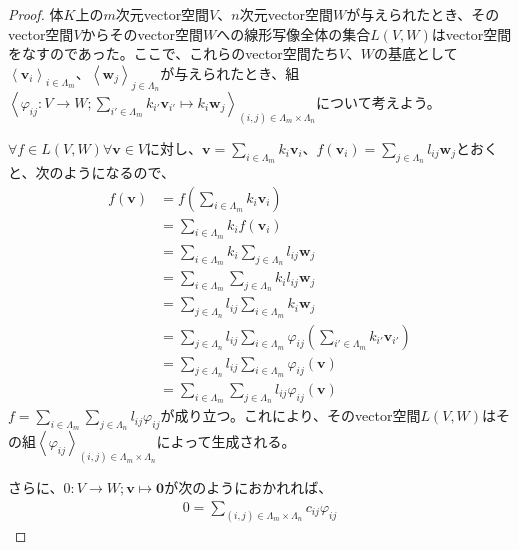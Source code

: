 \documentclass[dvipdfmx]{jsarticle}
\begin{document}
\begin{proof}
体$K$上の$m$次元vector空間$V$、$n$次元vector空間$W$が与えられたとき、そのvector空間$V$からそのvector空間$W$への線形写像全体の集合$L(V,W)$はvector空間をなすのであった。ここで、これらのvector空間たち$V$、$W$の基底として$\left\langle \mathbf{v}_{i} \right\rangle_{i \in \varLambda_{m}}$、$\left\langle \mathbf{w}_{j} \right\rangle_{j \in \varLambda_{n}}$が与えられたとき、組$\left\langle \varphi_{ij}:V \rightarrow W;\sum_{i' \in \varLambda_{m}} {k_{i'}\mathbf{v}_{i'}} \mapsto k_{i}\mathbf{w}_{j} \right\rangle_{(i,j) \in \varLambda_{m} \times \varLambda_{n}}$について考えよう。\par
$\forall f \in L(V,W)\forall\mathbf{v} \in V$に対し、$\mathbf{v} = \sum_{i \in \varLambda_{m}} {k_{i}\mathbf{v}_{i}}$、$f\left( \mathbf{v}_{i} \right) = \sum_{j \in \varLambda_{n}} {l_{ij}\mathbf{w}_{j}}$とおくと、次のようになるので、
\begin{align*}
f\left( \mathbf{v} \right) &= f\left( \sum_{i \in \varLambda_{m}} {k_{i}\mathbf{v}_{i}} \right)\\
&= \sum_{i \in \varLambda_{m}} {k_{i}f\left( \mathbf{v}_{i} \right)}\\
&= \sum_{i \in \varLambda_{m}} {k_{i}\sum_{j \in \varLambda_{n}} {l_{ij}\mathbf{w}_{j}}}\\
&= \sum_{i \in \varLambda_{m}} {\sum_{j \in \varLambda_{n}} {k_{i}l_{ij}\mathbf{w}_{j}}}\\
&= \sum_{j \in \varLambda_{n}} {l_{ij}\sum_{i \in \varLambda_{m}} {k_{i}\mathbf{w}_{j}}}\\
&= \sum_{j \in \varLambda_{n}} {l_{ij}\sum_{i \in \varLambda_{m}} {\varphi_{ij}\left( \sum_{i' \in \varLambda_{m}} {k_{i'}\mathbf{v}_{i'}} \right)}}\\
&= \sum_{j \in \varLambda_{n}} {l_{ij}\sum_{i \in \varLambda_{m}} {\varphi_{ij}\left( \mathbf{v} \right)}}\\
&= \sum_{i \in \varLambda_{m}} {\sum_{j \in \varLambda_{n}} {l_{ij}\varphi_{ij}\left( \mathbf{v} \right)}}
\end{align*}
$f = \sum_{i \in \varLambda_{m}} {\sum_{j \in \varLambda_{n}} {l_{ij}\varphi_{ij}}}$が成り立つ。これにより、そのvector空間$L(V,W)$はその組$\left\langle \varphi_{ij} \right\rangle_{(i,j) \in \varLambda_{m} \times \varLambda_{n}}$によって生成される。\par
さらに、$0:V \rightarrow W;\mathbf{v} \mapsto \mathbf{0}$が次のようにおかれれば、
\begin{align*}
0 = \sum_{(i,j) \in \varLambda_{m} \times \varLambda_{n}} {c_{ij}\varphi_{ij}}

\end{align*}
\end{proof}
\end{document}
